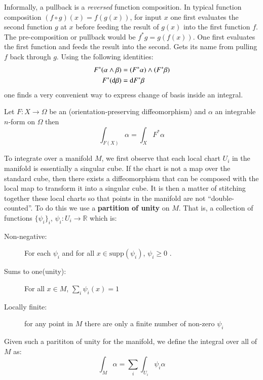 Informally, a pullback is a \emph{reversed} function composition.
In typical function composition $(f \circ g)(x) = f(g(x))$, for input $x$ one first evaluates the second function $g$ at $x$
before feeding the result of $g(x)$ into the first function $f$.
The pre-composition or pullback would be $f^*g = g(f(x))$. 
One first evaluates the first function and feeds the result into the second.
Gets its name from pulling $f$ back through $g$.
Using the following identities:
\begin{align}
	F^* (\alpha \wedge \beta ) &= (F^* \alpha) \wedge (F^* \beta) \\
	F^* (\mathop{}\!\mathrm{d} \beta ) &= \mathop{}\!\mathrm{d} F^* \beta
\end{align}
one finds a very convenient way to express change of basis inside an integral.

\begin{theorem}
Let $F : X  \to \Omega$ be an (orientation-preserving diffeomorphism) and $\alpha$ an integrable $n$-form on $\Omega$ then
\begin{equation}
\int_{F(X)} \alpha = \int_X F^* \alpha
\end{equation}
\end{theorem}



To integrate over a manifold $M$, we first observe that each local chart $U_i$ in the manifold is essentially a singular cube.
If the chart is not a map over the standard cube, then there exists a diffeomorphism 
that can be composed with the local map to transform it into a singular cube.
It is then a matter of stitching together these local charts so that points in the manifold are not ``double-counted''.
To do this we use a \textbf{partition of unity} on $M$.
That is, a collection of functions $\{ \psi_i \}_i$, $\psi_i: U_i \to \mathbb{R}$ which is:
\begin{description}
	\item[Non-negative:] For each $\psi_i$ and for all $x \in \text{supp}(\psi_i)$, $\psi_i \geq 0$ .
	\item[Sums to one(unity):] For all $x \in M$, $\sum_i \psi_i(x) = 1$
	\item[Locally finite:] for any point in $M$ there are only a finite number of non-zero $\psi_i$
\end{description}
Given such a parititon of unity for the manifold, we define the integral over all of $M$ as:
\begin{equation}
\int_M \alpha = \sum_i \int_{U_i} \psi_i \alpha
\end{equation}








